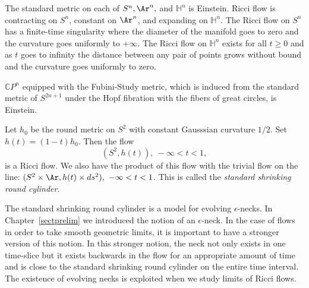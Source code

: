 \begin{example}\label{ex:einstein-ricci-flow}
The standard metric on each of $S^{n}, \Ar^{n},$ and ${\mathbb
H}^{n}$ is Einstein. Ricci flow is contracting on $S^n$, constant on
$\Ar^n$, and expanding on ${\mathbb H}^n$. The Ricci flow on $S^n$
has a finite-time singularity where the diameter of the manifold
goes to zero and the curvature goes uniformly to $+\infty$. The
Ricci flow on ${\mathbb H}^n$ exists for all $t\ge 0$ and as $t$
goes to infinity the distance between any pair of points grows
without bound and the curvature goes uniformly to zero.
\end{example}

\begin{example}\label{ex:fubini-study-metric}
$\mathbb{C}P^{n}$ equipped with the Fubini-Study metric, which is induced
from the standard metric of $S^{2n+1}$ under the Hopf fibration with the fibers
of great circles, is Einstein.
\end{example}


\begin{example}\label{ex:shrinking-round-cylinder}
Let $h_0$ be the round metric on $S^2$ with constant Gausssian
curvature $1/2$. Set $h(t)=(1-t)h_0$. Then the flow $$(S^2,h(t)),\
-\infty<t<1,$$ is a Ricci flow. We also have the product of this flow
with the trivial flow on the line: $(S^2\times \Ar,h(t)\times
ds^2),\ -\infty<t<1$. This is called the {\em standard shrinking
round cylinder}.
\end{example}

The standard shrinking round cylinder is a model for evolving
$\epsilon$-necks. In Chapter~\ref{sectprelim} we introduced the
notion of an $\epsilon$-neck. In the case of flows in order to take
smooth geometric limits, it is important to have a stronger version
of this notion. In this stronger notion, the neck not only exists in
one time-slice but it exists backwards in the flow for an
appropriate amount of time and is close to the standard shrinking
round cylinder on the entire time interval. The existence of
evolving necks
 is exploited when we study limits of Ricci flows.


